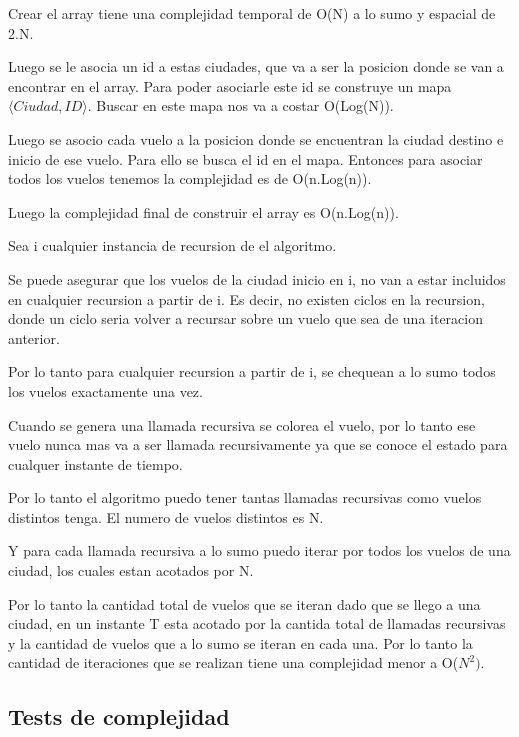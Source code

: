 Crear el array tiene una complejidad temporal de O(N) a lo sumo y espacial de 2.N.

Luego se le asocia un id a estas ciudades, que va a ser la posicion donde se van a encontrar en el array. Para poder asociarle este id se construye un mapa $\langle Ciudad,ID \rangle$.
Buscar en este mapa nos va a costar O(Log(N)).

Luego se asocio cada vuelo a la posicion donde se encuentran la ciudad destino e inicio de ese vuelo.
Para ello se busca el id en el mapa. Entonces para asociar todos los vuelos tenemos la complejidad es de O(n.Log(n)).

Luego la complejidad final de construir el array es O(n.Log(n)).

Sea i cualquier instancia de recursion de el algoritmo.

Se puede asegurar que los vuelos de la ciudad inicio en i, no van a estar incluidos en cualquier recursion a partir de i. Es decir, no existen ciclos en la recursion, donde un ciclo seria volver a recursar sobre un vuelo que sea de una iteracion anterior.

Por lo tanto para cualquier recursion a partir de i, se chequean a lo sumo todos los vuelos exactamente una vez.

Cuando se genera una llamada recursiva se colorea el vuelo, por lo tanto ese vuelo nunca mas va a ser llamada recursivamente ya que se conoce el estado para cualquer instante de tiempo.

Por lo tanto el algoritmo puedo tener tantas llamadas recursivas como vuelos distintos tenga.
El numero de vuelos distintos es N.

Y para cada llamada recursiva a lo sumo puedo iterar por todos los vuelos de una ciudad, los cuales estan acotados por N.

Por lo tanto la cantidad total de vuelos que se iteran dado que se llego a una ciudad, en un instante T esta acotado por la cantida total de llamadas recursivas y la cantidad de vuelos que a lo sumo se iteran en cada una. Por lo tanto la cantidad de iteraciones que se realizan tiene una complejidad menor a O($N^{2})$.





\subsection{Tests de complejidad}
